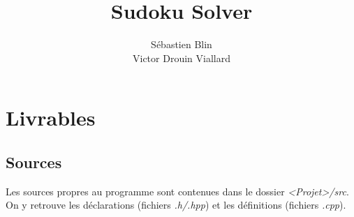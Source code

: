 \documentclass{article}
\title{Sudoku Solver}
\author{Sébastien Blin\\Victor Drouin Viallard}
\begin{document}
\maketitle

\sectioncompilation[0]

\section{Livrables}
\subsection{Sources}
Les sources propres au programme sont contenues dans le dossier
\emph{<Projet>/src}. On y retrouve les déclarations (fichiers \emph{.h/.hpp}) et
les définitions (fichiers \emph{.cpp}).
\end{document}
